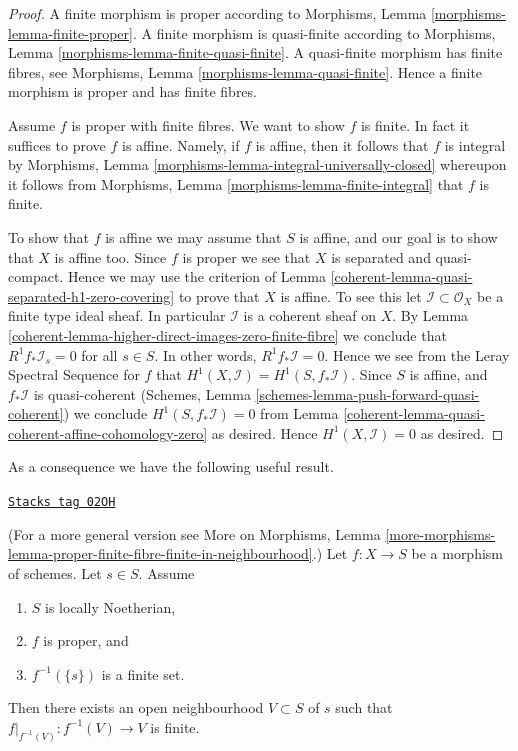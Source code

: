 \begin{proof}

A finite morphism is proper according to
Morphisms, Lemma \ref{morphisms-lemma-finite-proper}.
A finite morphism is quasi-finite according to
Morphisms, Lemma \ref{morphisms-lemma-finite-quasi-finite}.
A quasi-finite morphism has finite fibres, see
Morphisms, Lemma \ref{morphisms-lemma-quasi-finite}.
Hence a finite morphism is proper and has finite fibres.

\medskip\noindent
Assume $f$ is proper with finite fibres.
We want to show $f$ is finite.
In fact it suffices to prove $f$ is affine.
Namely, if $f$ is affine, then it follows that
$f$ is integral by
Morphisms, Lemma \ref{morphisms-lemma-integral-universally-closed}
whereupon it follows from
Morphisms, Lemma \ref{morphisms-lemma-finite-integral}
that $f$ is finite.

\medskip\noindent
To show that $f$ is affine we may assume that $S$ is affine, and our
goal is to show that $X$ is affine too.
Since $f$ is proper we see that $X$ is separated and quasi-compact.
Hence we may use the criterion of
Lemma \ref{coherent-lemma-quasi-separated-h1-zero-covering} to prove that $X$
is affine. To see this let $\mathcal{I} \subset \mathcal{O}_X$
be a finite type ideal sheaf. In particular $\mathcal{I}$ is
a coherent sheaf on $X$. By
Lemma \ref{coherent-lemma-higher-direct-images-zero-finite-fibre} we conclude that
$R^1f_*\mathcal{I}_s = 0$ for all $s \in S$.
In other words, $R^1f_*\mathcal{I} = 0$. Hence we see from
the Leray Spectral Sequence for $f$ that
$H^1(X , \mathcal{I}) = H^1(S, f_*\mathcal{I})$.
Since $S$ is affine, and $f_*\mathcal{I}$ is quasi-coherent
(Schemes, Lemma \ref{schemes-lemma-push-forward-quasi-coherent})
we conclude $H^1(S, f_*\mathcal{I}) = 0$
from Lemma \ref{coherent-lemma-quasi-coherent-affine-cohomology-zero}
as desired. Hence $H^1(X, \mathcal{I}) = 0$ as desired.
\end{proof}

As a consequence we have the following useful result.

\begin{lemma}
\label{coherent-lemma-proper-finite-fibre-finite-in-neighbourhood}
\href{https://stacks.math.columbia.edu/tag/02OH}{\texttt{Stacks tag 02OH}}


(For a more general version see
More on Morphisms,
Lemma \ref{more-morphisms-lemma-proper-finite-fibre-finite-in-neighbourhood}.)
Let $f : X \to S$ be a morphism of schemes.
Let $s \in S$.
Assume
\begin{enumerate}
\item $S$ is locally Noetherian,
\item $f$ is proper, and
\item $f^{-1}(\{s\})$ is a finite set.
\end{enumerate}
Then there exists an open neighbourhood $V \subset S$ of $s$
such that $f|_{f^{-1}(V)} : f^{-1}(V) \to V$ is finite.
\end{lemma}


